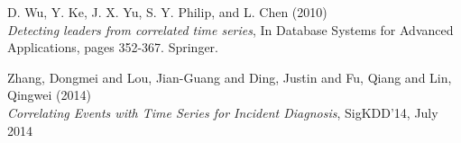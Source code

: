 \documentclass[12pt,a4paper]{article}
\begin{document}
\begin{thebibliography}{9}
D. Wu, Y. Ke, J. X. Yu, S. Y. Philip, and L. Chen (2010)\\
\textit{Detecting leaders from correlated time series}, In Database Systems for Advanced Applications, pages 352-367. Springer.

Zhang, Dongmei and Lou, Jian-Guang and Ding, Justin and Fu, Qiang and Lin, Qingwei (2014)\\
\textit{Correlating Events with Time Series for Incident Diagnosis},
SigKDD'14, July 2014\\



\end{thebibliography}
\end{document}
